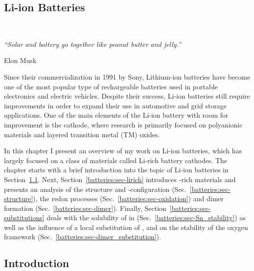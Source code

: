 \begin{refsection} 
 
\chapter{Li-ion Batteries}~\label{chapter:batteries} 
 
\setlength{\epigraphwidth}{3in} 
\epigraph{\textit{``Solar and battery go together like peanut butter and 
jelly.” }}{Elon Musk} 
\vspace{3em} 
 
Since their commercialization in 1991 by Sony, Lithium-ion batteries have 
become one of the most popular type of rechargeable batteries used in portable 
electronics and electric vehicles. Despite their success, Li-ion batteries 
still require improvements in order to expand their use in automotive and grid 
storage applications. One of the main elements of the Li-ion battery with room 
for improvement is the cathode, where research is primarily focused on 
polyanionic materials and layered transition metal (TM) oxides.  
 
In this chapter I present an overview of my work on Li-ion batteries, which 
has largely focused on a class of materials called Li-rich battery cathodes. 
The chapter starts with a brief introduction into the topic of Li-ion 
batteries in Section~\ref{batteries:sec-intro}. Next, 
Section~\ref{batteries:sec-lirich} introduces -rich materials and 
presents an analysis of the structure and -configuration 
(Sec.~\ref{batteries:sec-structure}), the redox processes 
(Sec.~\ref{batteries:sec-oxidation}) and dimer formation 
(Sec.~\ref{batteries:sec-dimer}). Finally, 
Section~\ref{batteries:sec-substitutions} deals with the solubility of  
in  (Sec.~\ref{batteries:sec-Sn_stability}) as well as the 
influence of a local substitution of ,  and  on the 
stability of the oxygen framework 
(Sec.~\ref{batteries:sec-dimer_substitution}). 
 
\clearpage 
 
\section{Introduction} \label{batteries:sec-intro} 
 

\end{refsection}
